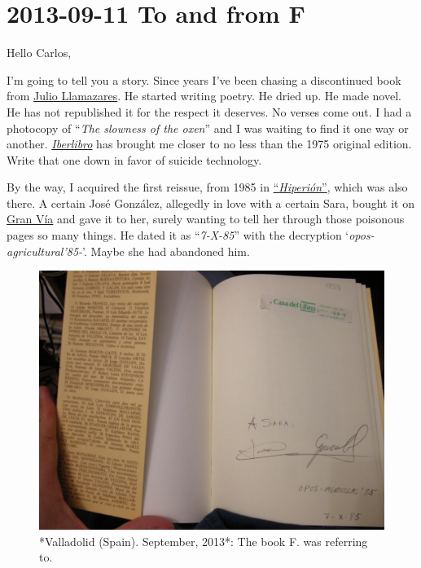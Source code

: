 \documentclass[]{book}
\begin{document}
\hypertarget{toF20130911}{%
\section*{2013-09-11 To and from F}\label{toF20130911}}

Hello Carlos,

I'm going to tell you a story. Since years I've been chasing a discontinued book from \href{https://en.wikipedia.org/wiki/Julio_Llamazares}{Julio Llamazares}. He started writing poetry. He dried up. He made novel. He has not republished it for the respect it deserves. No verses come out. I had a photocopy of ``\emph{The slowness of the oxen}'' \citep{llamazares1985lentitud} and I was waiting to find it one way or another. \href{https://www.iberlibro.com/}{\emph{Iberlibro}} has brought me closer to no less than the 1975 original edition. Write that one down in favor of suicide technology.

By the way, I acquired the first reissue, from 1985 in \href{https://www.hiperion.com/}{``\emph{Hiperión}''}, which was also there. A certain José González, allegedly in love with a certain Sara, bought it on \href{https://en.wikipedia.org/wiki/Gran_V\%C3\%ADa,_Madrid}{Gran Vía} and gave it to her, surely wanting to tell her through those poisonous pages so many things. He dated it as ``\emph{7-X-85}'' with the decryption `\emph{opos-agricultural'85-}'. Maybe she had abandoned him.

\begin{figure}

{\centering \includegraphics[width=0.75\linewidth]{images/2013/notas} 

}

\caption{*Valladolid (Spain). September, 2013*: The book F. was referring to.}\label{fig:notas}
\end{figure}
\end{document}

